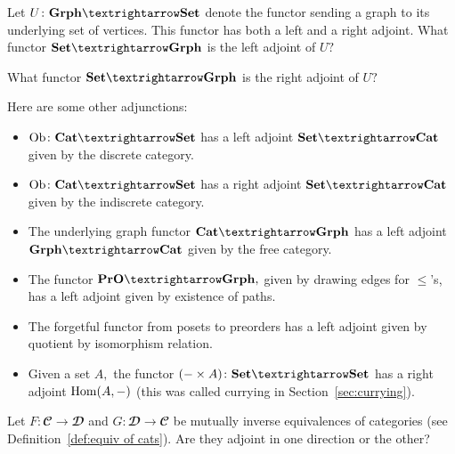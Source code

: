 \documentclass[../main/CT4S-EN-RU]{subfiles}
\begin{document}
\begin{exerciseENG}
Let $U\colon\Grph{→}\Set$ denote the functor sending a graph to its underlying set of vertices. This functor has both a left and a right adjoint. 
\sexc What functor $\Set{→}\Grph$ is the left adjoint of $U?$
\item What functor $\Set{→}\Grph$ is the right adjoint of $U?$
\endsexc
\end{exerciseENG}

\begin{exerciseRUS}
\end{exerciseRUS}

\begin{exampleENG}\label{ex:other adjunctions}
Here are some other adjunctions:

\begin{itemize}
\item $\Ob\colon\Cat{→}\Set$ has a left adjoint $\Set{→}\Cat$ given by the discrete category.
\item $\Ob\colon\Cat{→}\Set$ has a right adjoint $\Set{→}\Cat$ given by the indiscrete category.
\item The underlying graph functor $\Cat{→}\Grph$ has a left adjoint $\Grph{→}\Cat$ given by the free category.
\item The functor $\PrO{→}\Grph,$  given by drawing edges for $\leq$'s, has a left adjoint given by existence of paths.
\item The forgetful functor from posets to preorders has a left adjoint given by quotient by isomorphism relation.
\item Given a set $A,$ the functor $(-\times A)\colon\Set{→}\Set$ has a right adjoint $\operatorname{Hom}(A,-)$ (this was called currying in Section~\ref{sec:currying}). 
\end{itemize}
\end{exampleENG}

\begin{exampleRUS}\label{ex:other adjunctions}
\end{exampleRUS}

\begin{exerciseENG}
Let $F\colon{𝓒}{→}{𝓓}$ and $G\colon{𝓓}{→}{𝓒}$ be mutually inverse equivalences of categories (see Definition~\ref{def:equiv of cats}). Are they adjoint in one direction or the other?
\end{exerciseENG}
\end{document}
